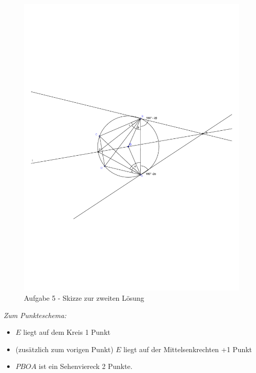 \documentclass[12pt,a4paper]{article}
\theoremstyle{plain}
\theoremstyle{definition}
\theoremstyle{remark}
\begin{document}
\begin{enumerate}
\begin{figure}[h]
\begin{center}
\includegraphics[width=14cm]{aufgabe5b.pdf}
\caption{Aufgabe 5 - Skizze zur zweiten Lösung}
\end{center}
\end{figure}


\emph{Zum Punkteschema:} 
\begin{itemize}
\item $E$ liegt auf dem Kreis 1 Punkt
\item (zusätzlich zum vorigen Punkt) $E$ liegt auf der Mittelsenkrechten +1 Punkt
 \item $PBOA$ ist ein Sehenviereck 2 Punkte.
 \end{itemize}
          



\end{enumerate}
\end{document}
